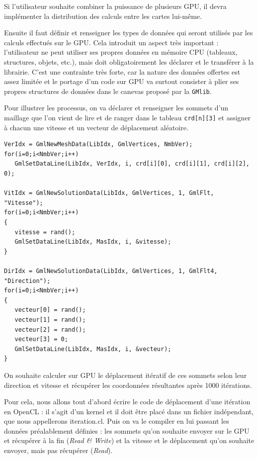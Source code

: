 \documentclass[a4paper,12pt]{article}
\begin{document}
Si l'utilisateur souhaite combiner la puissance de plusieurs GPU, il devra implémenter la distribution des calculs entre les cartes lui-même.

Ensuite il faut définir et renseigner les types de données qui seront utilisés par les calculs effectués sur le GPU.
Cela introduit un aspect très important : l'utilisateur ne peut utiliser ses propres données en mémoire CPU (tableaux, structures, objets, etc.), mais doit obligatoirement les déclarer et le transférer à la librairie. C'est une contrainte très forte, car la nature des données offertes est assez limitée et le portage d'un code sur GPU va surtout consister à plier ses propres structures de données dans le canevas proposé par la {\tt GMlib}.

Pour illustrer les processus, on va déclarer et renseigner les sommets d'un maillage que l'on vient de lire et de ranger dans le tableau {\tt crd[n][3]} et assigner à chacun une vitesse et un vecteur de déplacement aléatoire.

\begin{tt}
\begin{verbatim}
VerIdx = GmlNewMeshData(LibIdx, GmlVertices, NmbVer);
for(i=0;i<NmbVer;i++)
   GmlSetDataLine(LibIdx, VerIdx, i, crd[i][0], crd[i][1], crd[i][2], 0);

VitIdx = GmlNewSolutionData(LibIdx, GmlVertices, 1, GmlFlt, "Vitesse");
for(i=0;i<NmbVer;i++)
{
   vitesse = rand();
   GmlSetDataLine(LibIdx, MasIdx, i, &vitesse);
}

DirIdx = GmlNewSolutionData(LibIdx, GmlVertices, 1, GmlFlt4, "Direction");
for(i=0;i<NmbVer;i++)
{
   vecteur[0] = rand();
   vecteur[1] = rand();
   vecteur[2] = rand();
   vecteur[3] = 0;
   GmlSetDataLine(LibIdx, MasIdx, i, &vecteur);
}
\end{verbatim}
\end{tt}
\normalfont

On souhaite calculer sur GPU le déplacement itératif de ces sommets selon leur direction et vitesse et récupérer les coordonnées résultantes après 1000 itérations.

Pour cela, nous allons tout d'abord écrire le code de déplacement d'une itération en OpenCL : il s'agit d'un kernel et il doit être placé dans un fichier indépendant, que nous appellerons iteration.cl.
Puis on va le compiler en lui passant les données préalablement définies : les sommets qu'on souhaite envoyer sur le GPU et récupérer à la fin (\emph{Read \& Write}) et la vitesse et le déplacement qu'on souhaite envoyer, mais pas récupérer (\emph{Read}).
\end{document}
